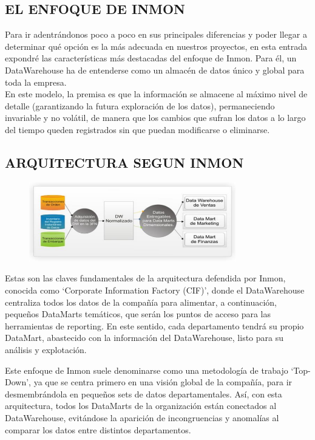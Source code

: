 \documentclass[%
 reprint,
 amsmath,amssymb,
 aps,
]{revtex4-1}
\begin{document}
\subsection{EL ENFOQUE DE INMON}
Para ir adentrándonos poco a poco en sus principales diferencias y poder llegar a determinar qué opción es la más adecuada en nuestros proyectos, en esta entrada expondré las características más destacadas del enfoque de Inmon.
Para él, un DataWarehouse ha de entenderse como un almacén de datos único y global para toda la empresa.
\\
En este modelo, la premisa es que la información se almacene al máximo nivel de detalle (garantizando la futura exploración de los datos), permaneciendo invariable y no volátil, de manera que los cambios que sufran los datos a lo largo del tiempo queden registrados sin que puedan modificarse o eliminarse.

\subsection{ARQUITECTURA SEGUN INMON}
\begin{figure}[htb]
				\begin{center}
					\includegraphics[width=9cm]{./IMAGENES/imgleydi2}
				\end{center}
			\end{figure}

Estas son las claves fundamentales de la arquitectura defendida por Inmon, conocida como ‘Corporate Information Factory (CIF)’, donde el DataWarehouse centraliza todos los datos de la compañía para alimentar, a continuación, pequeños DataMarts temáticos, que serán los puntos de acceso para las herramientas de reporting. En este sentido, cada departamento tendrá su propio DataMart, abastecido con la información del DataWarehouse, listo para su análisis y explotación.
 \cite{robles1}

Este enfoque de Inmon suele denominarse como una metodología de trabajo ‘Top-Down’, ya que se centra primero en una visión global de la compañía, para ir desmembrándola en pequeños sets de datos departamentales. Así, con esta arquitectura, todos los DataMarts de la organización están conectados al DataWarehouse, evitándose la aparición de incongruencias y anomalías al comparar los datos entre distintos departamentos.
\end{document}
